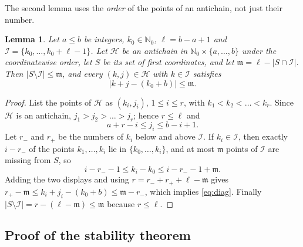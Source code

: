 \documentclass[11pt,a4paper]{article}
\numberwithin{equation}{section}
\theoremstyle{plain}
\newtheorem{lemma}[theorem]{Lemma}
\theoremstyle{definition}
\theoremstyle{remark}
\newcommand{\N}{\mathbb{N}}
\newcommand{\cH}{\mathcal{H}}
\newcommand{\cI}{\mathcal{I}}
\newcommand{\fm}{\mathfrak{m}}
\begin{document}
The second lemma uses the \emph{order} of the points of an antichain, not just their number.

\begin{lemma}\label{lem:antichain}
Let $a\le b$ be integers, $k_0\in\N_0$, $\ell=b-a+1$ and $\cI=\{k_0,\dots,k_0+\ell-1\}$. Let $\cH$ be an antichain in $\N_0\times\{a,\dots,b\}$ under the coordinatewise order, let $S$ be its set of first coordinates, and let $\fm=\ell-|S\cap\cI|$. Then $|S\setminus\cI|\le\fm$, and every $(k,j)\in\cH$ with $k\in\cI$ satisfies
\begin{equation}\label{eq:diag}
|k+j-(k_0+b)|\le\fm.
\end{equation}
\end{lemma}

\begin{proof}
List the points of $\cH$ as $(k_i,j_i)$, $1\le i\le r$, with $k_1<k_2<\dots<k_r$. Since $\cH$ is an antichain, $j_1>j_2>\dots>j_r$; hence $r\le\ell$ and
\[
a+r-i\le j_i\le b-i+1 .
\]
Let $r_-$ and $r_+$ be the numbers of $k_i$ below and above $\cI$. If $k_i\in\cI$, then exactly $i-r_-$ of the points $k_1,\dots,k_i$ lie in $\{k_0,\dots,k_i\}$, and at most $\fm$ points of $\cI$ are missing from $S$, so
\[
i-r_--1\le k_i-k_0\le i-r_--1+\fm .
\]
Adding the two displays and using $r=r_-+r_++\ell-\fm$ gives $r_+-\fm\le k_i+j_i-(k_0+b)\le\fm-r_-$, which implies \eqref{eq:diag}. Finally $|S\setminus\cI|=r-(\ell-\fm)\le\fm$ because $r\le\ell$.
\end{proof}

\subsection{Proof of the stability theorem}
\end{document}
